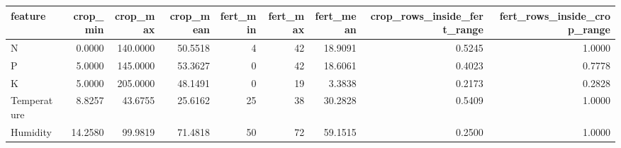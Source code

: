 \begin{tabular}{lrrrrrrrr}
\toprule
feature & crop_min & crop_max & crop_mean & fert_min & fert_max & fert_mean & crop_rows_inside_fert_range & fert_rows_inside_crop_range \\
\midrule
N & 0.0000 & 140.0000 & 50.5518 & 4 & 42 & 18.9091 & 0.5245 & 1.0000 \\
P & 5.0000 & 145.0000 & 53.3627 & 0 & 42 & 18.6061 & 0.4023 & 0.7778 \\
K & 5.0000 & 205.0000 & 48.1491 & 0 & 19 & 3.3838 & 0.2173 & 0.2828 \\
Temperature & 8.8257 & 43.6755 & 25.6162 & 25 & 38 & 30.2828 & 0.5409 & 1.0000 \\
Humidity & 14.2580 & 99.9819 & 71.4818 & 50 & 72 & 59.1515 & 0.2500 & 1.0000 \\
\bottomrule
\end{tabular}

